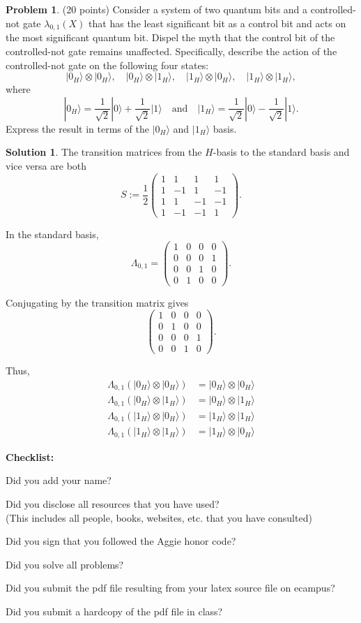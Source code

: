 \documentclass{article}
\theoremstyle{definition}
\newtheorem{problem}{Problem}
\newtheorem*{solution}{Solution}
\newcommand{\ket}[1]{|#1\rangle}
\newcommand{\checklist}{\noindent\textbf{Checklist:}
\begin{compactitem}[$\Box$] 
\item Did you add your name? 
\item Did you disclose all resources that you have used? \\
(This includes all people, books, websites, etc. that you have consulted)
\item Did you sign that you followed the Aggie honor code? 
\item Did you solve all problems? 
\item Did you submit the pdf file resulting from your latex source
  file on ecampus? 
\item Did you submit a hardcopy of the pdf file in class? 
\end{compactitem}
}
\begin{document}
\begin{problem}(20 points) 
  Consider a system of two quantum bits and a controlled-not gate
  $\lambda_{0,1}(X)$ that has the least significant bit as a control
  bit and acts on the most significant quantum bit. Dispel the myth
  that the control bit of the controlled-not gate remains
  unaffected. Specifically, describe the action of the controlled-not gate on the
  following four states:
$$ 
\ket{0_H} \otimes \ket{0_H}, \quad 
\ket{0_H} \otimes \ket{1_H}, \quad 
\ket{1_H} \otimes \ket{0_H}, \quad 
\ket{1_H} \otimes \ket{1_H},
$$
where 
$$ \ket{0_H} = \frac{1}{\sqrt{2}}\ket{0} +
\frac{1}{\sqrt{2}}\ket{1}\quad\text{and}\quad
\ket{1_H} = \frac{1}{\sqrt{2}}\ket{0} -
\frac{1}{\sqrt{2}}\ket{1}.$$
Express the result in terms of the $\ket{0_H}$ and $\ket{1_H}$ basis. 
\end{problem}
\begin{solution}
The transition matrices from the $H$-basis to the standard basis and vice versa are both
$$S := \frac{1}{2}
\begin{pmatrix}
1 & 1 & 1 & 1 \\
1 & -1 & 1 & -1 \\
1 & 1 & -1 & -1 \\
1 & -1 & -1 & 1
\end{pmatrix}.
$$

In the standard basis,
$$\Lambda_{0,1} = 
\begin{pmatrix}
1 & 0 & 0 & 0 \\
0 & 0 & 0 & 1 \\
0 & 0 & 1 & 0 \\
0 & 1 & 0 & 0
\end{pmatrix}.
$$

Conjugating by the transition matrix gives 
$$
\begin{pmatrix}
1 & 0 & 0 & 0 \\
0 & 1 & 0 & 0 \\
0 & 0 & 0 & 1 \\
0 & 0 & 1 & 0
\end{pmatrix}.
$$

Thus,
\begin{align*}
\Lambda_{0,1} (\ket{0_H} \otimes \ket{0_H}) & = \ket{0_H} \otimes \ket{0_H} \\ 
\Lambda_{0,1} (\ket{0_H} \otimes \ket{1_H}) & = \ket{0_H} \otimes \ket{1_H} \\
\Lambda_{0,1} (\ket{1_H} \otimes \ket{0_H}) & = \ket{1_H} \otimes \ket{1_H} \\
\Lambda_{0,1} (\ket{1_H} \otimes \ket{1_H}) & = \ket{1_H} \otimes \ket{0_H} 
\end{align*}

\end{solution}


















\goodbreak
\checklist
\end{document}

